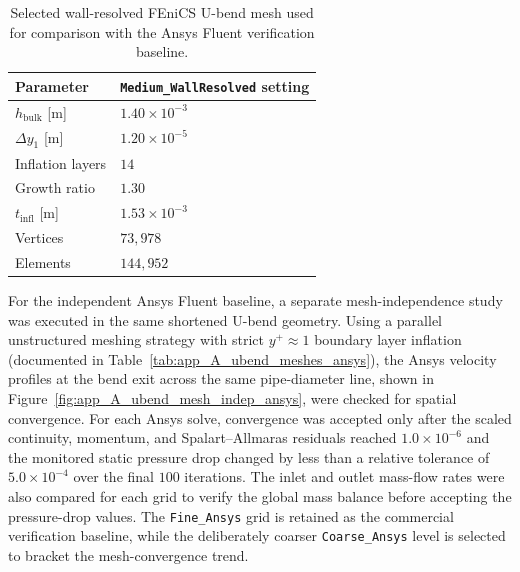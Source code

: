 	\begin{table}[htbp]
		\centering
		\footnotesize
		\caption{Selected wall-resolved FEniCS U-bend mesh used for comparison with the Ansys Fluent verification baseline.}
		\label{tab:app_A_ubend_meshes}
		\renewcommand{\arraystretch}{1.2}
		\begin{tabularx}{0.82\textwidth}{l X}
			\hline
				\textbf{Parameter} & \textbf{\texttt{Medium\_WallResolved} setting} \\
				\hline
				$h_{\mathrm{bulk}}$ [m] & $1.40 \times 10^{-3}$ \\
				$\Delta y_1$ [m] & $1.20 \times 10^{-5}$ \\
				Inflation layers & $14$ \\
				Growth ratio & $1.30$ \\
				$t_{\mathrm{infl}}$ [m] & $1.53 \times 10^{-3}$ \\
				Vertices & $73{,}978$ \\
				Elements & $144{,}952$ \\
			\hline
		\end{tabularx}
	\end{table}

For the independent Ansys Fluent baseline, a separate mesh-independence study was executed in the same shortened U-bend geometry. Using a parallel unstructured meshing strategy with strict $y^+ \approx 1$ boundary layer inflation (documented in Table~\ref{tab:app_A_ubend_meshes_ansys}), the Ansys velocity profiles at the bend exit across the same pipe-diameter line, shown in Figure~\ref{fig:app_A_ubend_mesh_indep_ansys}, were checked for spatial convergence. For each Ansys solve, convergence was accepted only after the scaled continuity, momentum, and Spalart--Allmaras residuals reached $1.0\times10^{-6}$ and the monitored static pressure drop changed by less than a relative tolerance of $5.0\times10^{-4}$ over the final $100$ iterations. The inlet and outlet mass-flow rates were also compared for each grid to verify the global mass balance before accepting the pressure-drop values. The \texttt{Fine\_Ansys} grid is retained as the commercial verification baseline, while the deliberately coarser \texttt{Coarse\_Ansys} level is selected to bracket the mesh-convergence trend.

